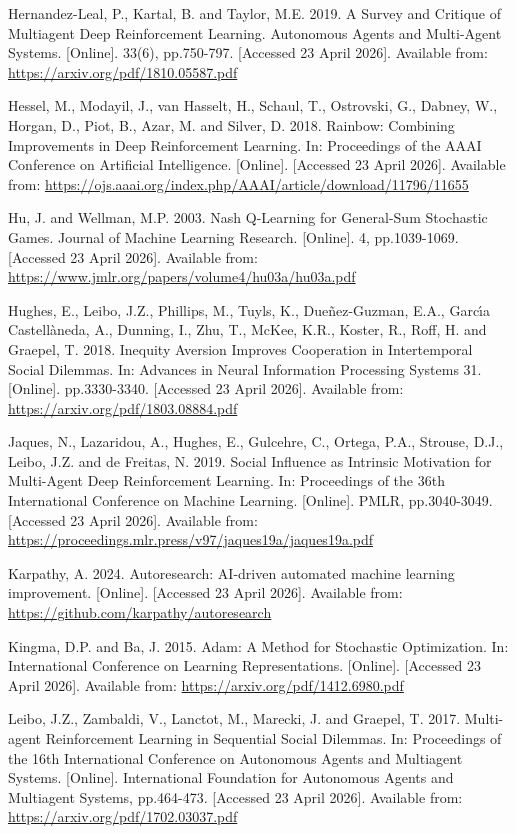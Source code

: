 Hernandez-Leal, P., Kartal, B. and Taylor, M.E. 2019. A Survey and Critique of Multiagent Deep Reinforcement Learning. Autonomous Agents and Multi-Agent Systems. [Online]. 33(6), pp.750-797. [Accessed 23 April 2026]. Available from: \url{https://arxiv.org/pdf/1810.05587.pdf}

Hessel, M., Modayil, J., van Hasselt, H., Schaul, T., Ostrovski, G., Dabney, W., Horgan, D., Piot, B., Azar, M. and Silver, D. 2018. Rainbow: Combining Improvements in Deep Reinforcement Learning. In: Proceedings of the AAAI Conference on Artificial Intelligence. [Online]. [Accessed 23 April 2026]. Available from: \url{https://ojs.aaai.org/index.php/AAAI/article/download/11796/11655}

Hu, J. and Wellman, M.P. 2003. Nash {Q}-Learning for General-Sum Stochastic Games. Journal of Machine Learning Research. [Online]. 4, pp.1039-1069. [Accessed 23 April 2026]. Available from: \url{https://www.jmlr.org/papers/volume4/hu03a/hu03a.pdf}

Hughes, E., Leibo, J.Z., Phillips, M., Tuyls, K., Due{\~{n}}ez-Guzman, E.A., Garc{\'{\i}}a Castell{\`{a}}neda, A., Dunning, I., Zhu, T., McKee, K.R., Koster, R., Roff, H. and Graepel, T. 2018. Inequity Aversion Improves Cooperation in Intertemporal Social Dilemmas. In: Advances in Neural Information Processing Systems 31. [Online]. pp.3330-3340. [Accessed 23 April 2026]. Available from: \url{https://arxiv.org/pdf/1803.08884.pdf}

Jaques, N., Lazaridou, A., Hughes, E., Gulcehre, C., Ortega, P.A., Strouse, D.J., Leibo, J.Z. and de Freitas, N. 2019. Social Influence as Intrinsic Motivation for Multi-Agent Deep Reinforcement Learning. In: Proceedings of the 36th International Conference on Machine Learning. [Online]. PMLR, pp.3040-3049. [Accessed 23 April 2026]. Available from: \url{https://proceedings.mlr.press/v97/jaques19a/jaques19a.pdf}

Karpathy, A. 2024. Autoresearch: {AI}-driven automated machine learning improvement. [Online]. [Accessed 23 April 2026]. Available from: \url{https://github.com/karpathy/autoresearch}

Kingma, D.P. and Ba, J. 2015. {Adam}: A Method for Stochastic Optimization. In: International Conference on Learning Representations. [Online]. [Accessed 23 April 2026]. Available from: \url{https://arxiv.org/pdf/1412.6980.pdf}

Leibo, J.Z., Zambaldi, V., Lanctot, M., Marecki, J. and Graepel, T. 2017. Multi-agent Reinforcement Learning in Sequential Social Dilemmas. In: Proceedings of the 16th International Conference on Autonomous Agents and Multiagent Systems. [Online]. International Foundation for Autonomous Agents and Multiagent Systems, pp.464-473. [Accessed 23 April 2026]. Available from: \url{https://arxiv.org/pdf/1702.03037.pdf}

